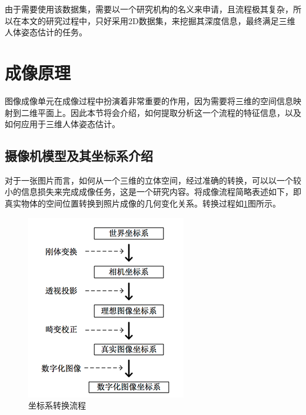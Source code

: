 由于需要使用该数据集，需要以一个研究机构的名义来申请，且流程极其复杂，所以在本文的研究过程中，只好采用2D数据集，来挖掘其深度信息，最终满足三维人体姿态估计的任务。

\section{成像原理}

图像成像单元在成像过程中扮演着非常重要的作用，因为需要将三维的空间信息映射到二维平面上。因此本节将会介绍，如何提取分析这一个流程的特征信息，以及如何应用于三维人体姿态估计。

\subsection{摄像机模型及其坐标系介绍}

对于一张图片而言，如何从一个三维的立体空间，经过准确的转换，可以以一个较小的信息损失来完成成像任务，这是一个研究内容。将成像流程简略表述如下，即真实物体的空间位置转换到照片成像的几何变化关系。转换过程如\ref{4_para_trans}图所示。

\begin{figure}[h]
	\includegraphics[height=\textwidth]{pic/4_para_trans.png}
	\caption{坐标系转换流程}
	\label{4_para_trans}
\end{figure}

